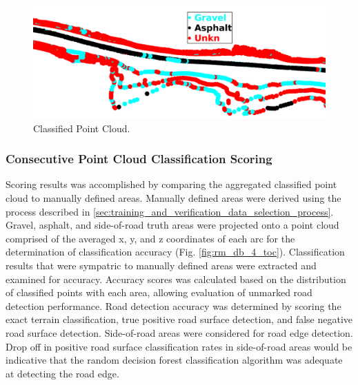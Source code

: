 \documentclass[numbered,pdftex]{ohio-etd}
\begin{document}
{{{{{				\begin{figure}[H]
					\centering
					\includegraphics[width=0.9\linewidth]{Defense_Images/classified_point_cloud_example_redux}
					\caption[Classified Point Cloud]{Classified Point Cloud.}
					\label{fig:raw_classification_results}
				\end{figure}
				
			}
			
			\subsubsection{Consecutive Point Cloud Classification Scoring}\label{sec:consecutive_point_cloud_classification_scoring}{
				
				{Scoring results was accomplished by comparing the aggregated classified point cloud to manually defined areas. Manually defined areas were derived using the process described in \ref{sec:training_and_verification_data_selection_process}. Gravel, asphalt, and side-of-road truth areas were projected onto a point cloud comprised of the averaged x, y, and z coordinates of each arc for the determination of classification accuracy (Fig. \ref{fig:rm_db_4_toc}). Classification results that were sympatric to manually defined areas were extracted and examined for accuracy. Accuracy scores was calculated based on the distribution of classified points with each area, allowing evaluation of unmarked road detection performance. Road detection accuracy was determined by scoring the exact terrain classification, true positive road surface detection, and false negative road surface detection. Side-of-road areas were considered for road edge detection. Drop off in positive road surface classification rates in side-of-road areas would be indicative that the random decision forest classification algorithm was adequate at detecting the road edge.}
				

}}}}}
\end{document}

